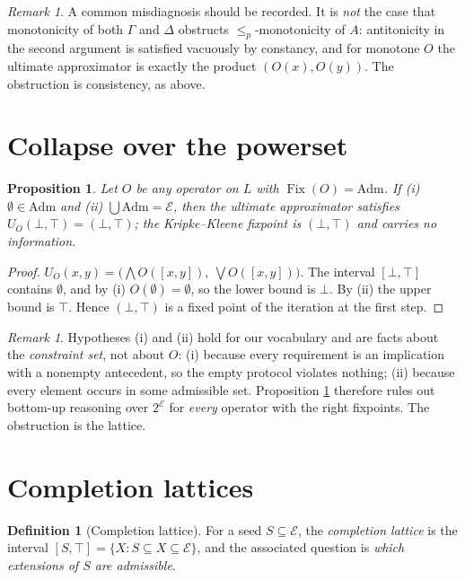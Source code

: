 \documentclass[11pt,reqno]{amsart}
\theoremstyle{plain}
\newtheorem{proposition}[theorem]{Proposition}
\theoremstyle{definition}
\newtheorem{definition}[theorem]{Definition}
\theoremstyle{remark}
\newtheorem{remark}[theorem]{Remark}
\newcommand{\Admf}{\mathrm{Adm}}
\newcommand{\Fix}{\operatorname{Fix}}
\newcommand{\El}{\mathcal{E}}
\begin{document}
\begin{remark}
A common misdiagnosis should be recorded. It is \emph{not} the case that
monotonicity of both $\Gamma$ and $\Delta$ obstructs $\le_p$-monotonicity of $A$:
antitonicity in the second argument is satisfied vacuously by constancy, and for
monotone $O$ the ultimate approximator is exactly the product
$(O(x), O(y))$. The obstruction is consistency, as above.
\end{remark}

\section{Collapse over the powerset}

\begin{proposition}\label{prop:collapse}
Let $O$ be any operator on $L$ with $\Fix(O) = \Admf$. If
\emph{(i)} $\emptyset \in \Admf$ and \emph{(ii)} $\bigcup \Admf = \El$, then the
ultimate approximator satisfies $U_O(\bot,\top) = (\bot,\top)$; the
Kripke--Kleene fixpoint is $(\bot,\top)$ and carries no information.
\end{proposition}

\begin{proof}
$U_O(x,y) = \bigl(\bigwedge O([x,y]),\ \bigvee O([x,y])\bigr)$. The interval
$[\bot,\top]$ contains $\emptyset$, and by (i) $O(\emptyset) = \emptyset$, so the
lower bound is $\bot$. By (ii) the upper bound is $\top$. Hence
$(\bot,\top)$ is a fixed point of the iteration at the first step.
\end{proof}

\begin{remark}
Hypotheses (i) and (ii) hold for our vocabulary and are facts about the
\emph{constraint set}, not about $O$: (i) because every requirement is an
implication with a nonempty antecedent, so the empty protocol violates nothing;
(ii) because every element occurs in some admissible set. Proposition
\ref{prop:collapse} therefore rules out bottom-up reasoning over $2^{\El}$ for
\emph{every} operator with the right fixpoints. The obstruction is the lattice.
\end{remark}

\section{Completion lattices}

\begin{definition}[Completion lattice]
For a seed $S \subseteq \El$, the \emph{completion lattice} is the interval
$[S,\top] = \{X : S \subseteq X \subseteq \El\}$, and the associated question is
\emph{which extensions of $S$ are admissible}.
\end{definition}
\end{document}
